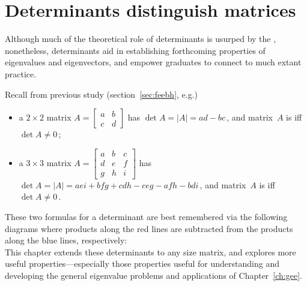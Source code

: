 
\chapter{Determinants distinguish matrices}%
\label{ch:ddm}
\minitoc

\begin{comment}
\pooliv{\S4.2} \layiv{\S3.1--2} \holti{\S5.1--2} 
This development is inspired by that of \cite{Hannah96} and the Uni Christchurch (\verb|ChristchurchDeterminants.pdf|).

The typical teaching of determinants starts from our endpoint: it starts with the Laplace Expansion Theorem~\ref{thm:letdet} as a definition of determinants and then works algebraically through the same properties developed here, but roughly in reverse order.
Many might view that the geometric development of the determinant presented here is not as rigorous as the typical algebraic development.
That may well be, but at its heart the determinant expresses a key geometric property of the matrix.
Also, in terms of learning and using determinants this geometric approach appears easier to learn, gets to key practical properties quicker, and better reinforces the properties that make determinants useful in applications.
\end{comment}

 
Although much of the theoretical role of determinants is usurped by the \svd, nonetheless, determinants aid in establishing forthcoming properties of eigenvalues and eigenvectors, and empower graduates to connect to much extant practice.

Recall from previous study (section~\ref{sec:feebh}, e.g.)
\begin{itemize}
\item a \(2\times 2\) matrix \(A=\begin{bmatrix} a&b\\c&d \end{bmatrix}\) has  \(\det A=|A|=ad-bc\)\,, and matrix~\(A\) is   iff \(\det A\neq0\)\,;
\item a \(3\times 3\) matrix \(A=\begin{bmatrix} a&b&c\\d&e&f\\g&h&i \end{bmatrix}\) has  \(\det A=|A|=aei+bfg+cdh-ceg-afh-bdi\)\,, and matrix~\(A\) is  iff \(\det A\neq0\)\,.
\end{itemize}
These two formulas for a determinant are best remembered via the following diagrams where products along the red lines are subtracted from the products along the blue lines, respectively:
\begin{equation}

\label{eq:dets23b}
\end{equation}
This chapter extends these determinants to any size matrix, and explores more useful properties---especially those properties useful for understanding and developing the general eigenvalue problems and applications of Chapter~\ref{ch:gee}.





\endinput

